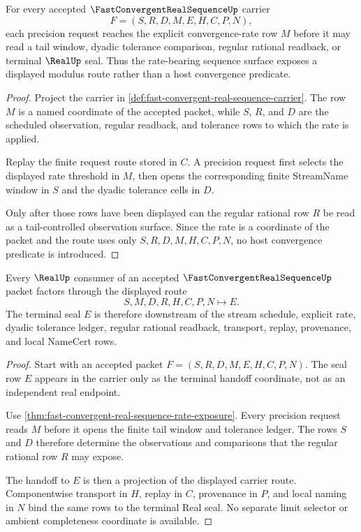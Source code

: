 \begin{theorem}
\label{thm:fast-convergent-real-sequence-rate-exposure}
For every accepted $\FastConvergentRealSequenceUp$ carrier
$$
F=(S,R,D,M,E,H,C,P,N),
$$
each precision request reaches the explicit convergence-rate row $M$ before it may read a tail window, dyadic tolerance comparison, regular rational readback, or terminal $\RealUp$ seal. Thus the rate-bearing sequence surface exposes a displayed modulus route rather than a host convergence predicate.
\end{theorem}
\begin{proof}
Project the carrier in \autoref{def:fast-convergent-real-sequence-carrier}. The row $M$ is a named coordinate of the accepted packet, while $S$, $R$, and $D$ are the scheduled observation, regular readback, and tolerance rows to which the rate is applied.

Replay the finite request route stored in $C$. A precision request first selects the displayed rate threshold in $M$, then opens the corresponding finite StreamName window in $S$ and the dyadic tolerance cells in $D$.

Only after those rows have been displayed can the regular rational row $R$ be read as a tail-controlled observation surface. Since the rate is a coordinate of the packet and the route uses only $S,R,D,M,H,C,P,N$, no host convergence predicate is introduced.
\end{proof}

\begin{theorem}
\label{thm:fast-convergent-real-sequence-real-seal-handoff}
Every $\RealUp$ consumer of an accepted $\FastConvergentRealSequenceUp$ packet factors through the displayed route
$$
S,M,D,R,H,C,P,N \longmapsto E.
$$
The terminal seal $E$ is therefore downstream of the stream schedule, explicit rate, dyadic tolerance ledger, regular rational readback, transport, replay, provenance, and local NameCert rows.
\end{theorem}
\begin{proof}
Start with an accepted packet $F=(S,R,D,M,E,H,C,P,N)$. The seal row $E$ appears in the carrier only as the terminal handoff coordinate, not as an independent real endpoint.

Use \autoref{thm:fast-convergent-real-sequence-rate-exposure}. Every precision request reads $M$ before it opens the finite tail window and tolerance ledger. The rows $S$ and $D$ therefore determine the observations and comparisons that the regular rational row $R$ may expose.

The handoff to $E$ is then a projection of the displayed carrier route. Componentwise transport in $H$, replay in $C$, provenance in $P$, and local naming in $N$ bind the same rows to the terminal Real seal. No separate limit selector or ambient completeness coordinate is available.
\end{proof}


